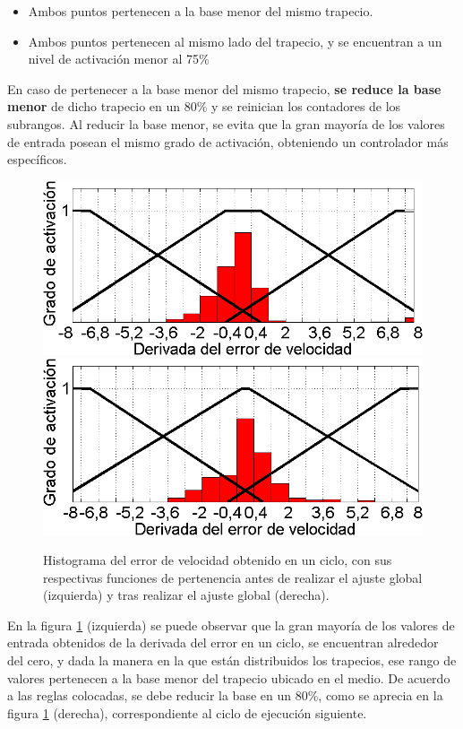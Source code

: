 \begin{itemize}
\item Ambos puntos pertenecen a la base menor del mismo trapecio.
\item Ambos puntos pertenecen al mismo lado del trapecio, y se encuentran a un nivel de activación menor al 75\%
\end{itemize} 

En caso de pertenecer a la base menor del mismo trapecio, \textbf{se reduce la base menor}  de dicho trapecio en un 80\% y se reinician los contadores de los subrangos. Al reducir la base menor, se evita que la gran mayoría de los valores de entrada posean el mismo grado de activación, obteniendo un controlador más específicos. 

\begin{figure}[htb]
\centering
\includegraphics[width=0.45\linewidth,type=png,ext=.png,read=.png]{figures/label11}\hspace{0.5cm} \includegraphics[width=0.45\linewidth,type=png,ext=.png,read=.png]{figures/label12}
\caption{Histograma del error de velocidad obtenido en un ciclo, con sus respectivas funciones de pertenencia antes de realizar el ajuste global (izquierda) y tras realizar el ajuste global (derecha).}
\label{fig:label11}
\end{figure} 

En la figura \ref{fig:label11} (izquierda) se puede observar que la gran mayoría de los valores de entrada obtenidos de la derivada del error en un ciclo, se encuentran alrededor del cero, y dada la manera en la que están distribuidos los trapecios, ese rango de valores pertenecen a la base menor del trapecio ubicado en el medio. De acuerdo a las reglas colocadas, se debe reducir la base en un 80\%, como se aprecia en la figura \ref{fig:label11} (derecha), correspondiente al ciclo de ejecución siguiente.


